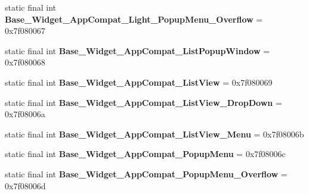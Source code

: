 \begin{DoxyCompactItemize}
\item 
\hypertarget{classandroid_1_1support_1_1v7_1_1appcompat_1_1_r_1_1style_a3de145bd9f6d8e62d338bf486619da5b}{}static final int {\bfseries Base\+\_\+\+Widget\+\_\+\+App\+Compat\+\_\+\+Light\+\_\+\+Popup\+Menu\+\_\+\+Overflow} = 0x7f080067\label{classandroid_1_1support_1_1v7_1_1appcompat_1_1_r_1_1style_a3de145bd9f6d8e62d338bf486619da5b}

\item 
\hypertarget{classandroid_1_1support_1_1v7_1_1appcompat_1_1_r_1_1style_a5a8c0b50418d32051e5f61365c8b8951}{}static final int {\bfseries Base\+\_\+\+Widget\+\_\+\+App\+Compat\+\_\+\+List\+Popup\+Window} = 0x7f080068\label{classandroid_1_1support_1_1v7_1_1appcompat_1_1_r_1_1style_a5a8c0b50418d32051e5f61365c8b8951}

\item 
\hypertarget{classandroid_1_1support_1_1v7_1_1appcompat_1_1_r_1_1style_aa10a4813e78697cb0b6a93321b659876}{}static final int {\bfseries Base\+\_\+\+Widget\+\_\+\+App\+Compat\+\_\+\+List\+View} = 0x7f080069\label{classandroid_1_1support_1_1v7_1_1appcompat_1_1_r_1_1style_aa10a4813e78697cb0b6a93321b659876}

\item 
\hypertarget{classandroid_1_1support_1_1v7_1_1appcompat_1_1_r_1_1style_a03f9bb002e1b5558f1c636204e2c8e67}{}static final int {\bfseries Base\+\_\+\+Widget\+\_\+\+App\+Compat\+\_\+\+List\+View\+\_\+\+Drop\+Down} = 0x7f08006a\label{classandroid_1_1support_1_1v7_1_1appcompat_1_1_r_1_1style_a03f9bb002e1b5558f1c636204e2c8e67}

\item 
\hypertarget{classandroid_1_1support_1_1v7_1_1appcompat_1_1_r_1_1style_a7cdf63459830b3d4f230ec698e252e41}{}static final int {\bfseries Base\+\_\+\+Widget\+\_\+\+App\+Compat\+\_\+\+List\+View\+\_\+\+Menu} = 0x7f08006b\label{classandroid_1_1support_1_1v7_1_1appcompat_1_1_r_1_1style_a7cdf63459830b3d4f230ec698e252e41}

\item 
\hypertarget{classandroid_1_1support_1_1v7_1_1appcompat_1_1_r_1_1style_aeb2e167384b173a5b7eccad9e709dc4d}{}static final int {\bfseries Base\+\_\+\+Widget\+\_\+\+App\+Compat\+\_\+\+Popup\+Menu} = 0x7f08006c\label{classandroid_1_1support_1_1v7_1_1appcompat_1_1_r_1_1style_aeb2e167384b173a5b7eccad9e709dc4d}

\item 
\hypertarget{classandroid_1_1support_1_1v7_1_1appcompat_1_1_r_1_1style_a622b3b8e1b4687c1bb1aed07dd86ba93}{}static final int {\bfseries Base\+\_\+\+Widget\+\_\+\+App\+Compat\+\_\+\+Popup\+Menu\+\_\+\+Overflow} = 0x7f08006d\label{classandroid_1_1support_1_1v7_1_1appcompat_1_1_r_1_1style_a622b3b8e1b4687c1bb1aed07dd86ba93}


\end{DoxyCompactItemize}
